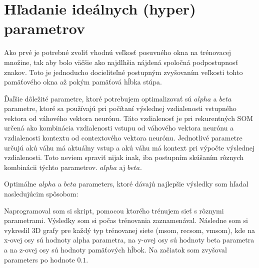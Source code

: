 \section{Hľadanie ideálnych (hyper) parametrov}
Ako prvé je potrebné zvoliť vhodnú veľkosť posuvného okna na trénovacej množine, tak aby bolo väčšie ako
najdlhšia nájdená spoločná podpostupnosť znakov. 
Toto je jednoducho docieliteľné postupným zvyšovaním veľkosti tohto pamäťového okna až pokým pamäťová hĺbka stúpa.

Ďaľšie dôležité parametre, ktoré potrebujem optimalizovať sú $alpha$ a $beta$ parametre, ktoré
sa používajú pri počítaní výslednej vzdialenosti vstupného vektora od váhového vektora neurónu.
Táto vzdialenosť je pri rekurentných SOM určená ako kombinácia vzdialenosti vstupu od váhového vektora neurónu a vzdialenosti
kontextu od contextového vektora neurónu.
Jednotlivé parametre určujú akú váhu má aktuálny vstup a akú váhu má kontext pri výpočte výslednej vzdialenosti.
Toto neviem spraviť nijak inak, iba postupním skúšaním rôznych kombinácii týchto parametrov. 
$alpha$ aj $beta$.

Optimálne $alpha$ a $beta$ parameters, ktoré dávajú najlepšie výsledky som hľadal nasledujúcim
spôsobom:

Naprogramoval som si skript, pomocou ktorého trénujem sieť s rôznymi parametrami.
Výsledky som si počas trénovania zaznamenával.
Následne som si vykreslil 3D grafy pre každý typ trénovanej siete (msom, recsom, vmsom), 
kde na x-ovej osy sú hodnoty alpha parametra, na y-ovej osy sú hodnoty beta parametra a
na z-ovej osy sú hodnoty pamäťových hĺbok.
Na začiatok som zvyšoval parameters po hodnote $0.1$.








